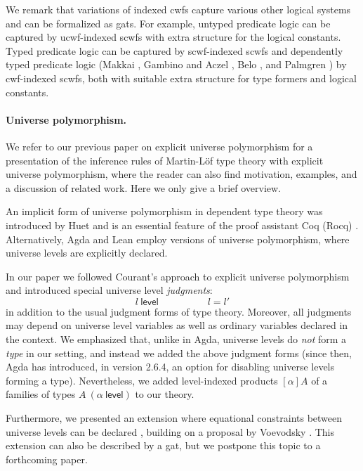 \documentclass[11pt,a4paper]{article}
\theoremstyle{plain}
\theoremstyle{definition}
\newcommand{\level}{\mathsf{level}}
\begin{document}
We remark that variations of indexed cwfs capture various other logical systems and can be formalized as gats. For example, untyped predicate logic can be captured by ucwf-indexed scwfs with extra structure for the logical constants. Typed predicate logic can be captured by scwf-indexed scwfs and dependently typed predicate logic (Makkai \cite{makkai:folds}, Gambino and Aczel \cite{gambino-aczel}, Belo \cite{belo}, and Palmgren \cite{Palmgren19}) by cwf-indexed scwfs, both with suitable extra structure for type formers and logical constants.
\paragraph{Universe polymorphism.} We refer to our previous paper on explicit universe polymorphism \cite{BezemCDE22} for a presentation of the inference rules of Martin-Löf type theory with explicit universe polymorphism, where the reader can also find motivation, examples, and a discussion of related work. Here we only give a brief overview.

An implicit form of universe polymorphism in dependent type theory was introduced by Huet \cite{Huet87} and is an essential feature of the proof assistant Coq (Rocq) \cite{coq:general}. Alternatively, Agda \cite{agda-wiki} and Lean \cite{moura:lean} employ versions of universe polymorphism, where universe levels are explicitly declared.

In our paper we followed Courant's approach \cite{Courant02} to explicit universe polymorphism and introduced special universe level {\em judgments}:
$$
l\ \level
\hspace{5em}
l = l'
$$
in addition to the usual judgment forms of type theory. Moreover, all judgments may depend on universe level variables as well as ordinary variables declared in the context. We emphasized that, unlike in Agda, universe levels do {\em not} form a {\em type} in our setting, and instead we added the above judgment forms (since then, Agda has introduced, in version 2.6.4, an option for disabling universe levels forming a type).  Nevertheless, we added level-indexed products $[\alpha]A$ of a families of types $A\ (\alpha\ \level)$ to our theory.

Furthermore, we presented an extension where equational constraints between universe levels can be declared \cite{BezemCDE22}, building on a proposal by Voevodsky \cite{VV}. This extension can also be described by a gat, but we postpone this topic to a forthcoming paper.
\end{document}
